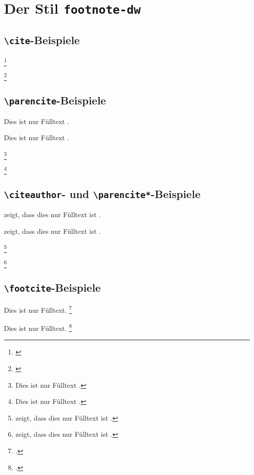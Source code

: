 \documentclass[a4paper]{article}
\newcommand{\cmd}[1]{\texttt{\textbackslash #1}}
\begin{document}
\section*{Der Stil \texttt{footnote-dw}}

\subsection*{\cmd{cite}-Beispiele}

\cite{aristotle:rhetoric}

\cite[59]{aristotle:rhetoric}

\footnote{\cite[Siehe][]{springer}}

\footnote{\cite[Siehe][92--95]{springer}}

\subsection*{\cmd{parencite}-Beispiele}

Dies ist nur Fülltext \parencite{aristotle:rhetoric}.

Dies ist nur Fülltext \parencite[59]{aristotle:rhetoric}.

\footnote{Dies ist nur Fülltext \parencite[Siehe][]{springer}.}

\footnote{Dies ist nur Fülltext \parencite[Siehe][92--95]{springer}.}

\subsection*{\cmd{citeauthor}- und \cmd{parencite*}-Beispiele}

\citeauthor{aristotle:rhetoric} zeigt, dass dies nur Fülltext
ist \parencite*{aristotle:rhetoric}.

\citeauthor{aristotle:rhetoric} zeigt, dass dies nur Fülltext
ist \parencite*[59]{aristotle:rhetoric}.

\footnote{\citeauthor{springer} zeigt, dass dies nur Fülltext
ist \parencite*[Siehe][]{springer}.}

\footnote{\citeauthor{springer} zeigt, dass dies nur Fülltext
ist \parencite*[Siehe][92--95]{springer}.}

\subsection*{\cmd{footcite}-Beispiele}

Dies ist nur Fülltext. \footcite{aristotle:rhetoric}

Dies ist nur Fülltext. \footcite[59]{aristotle:rhetoric}
\end{document}
